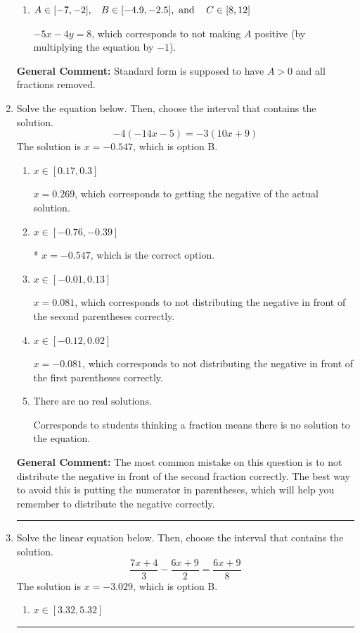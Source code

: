 \documentclass{extbook}[14pt]
\newcommand{\litem}[1]{\item #1

\rule{\textwidth}{0.4pt}}
\begin{document}
\begin{enumerate}
{\begin{enumerate}[label=\Alph*.]
 $1.25x + 1y = -2.0$, which corresponds to not removing rational values for Standard Form.
\item \( A \in [-7, -2], \hspace{3mm} B \in [-4.9, -2.5], \text{ and } \hspace{3mm} C \in [8, 12] \)

 $-5x - 4y = 8$, which corresponds to not making $A$ positive (by multiplying the equation by $-1$).
\end{enumerate}

\textbf{General Comment:} Standard form is supposed to have $A > 0$ and all fractions removed.
}
\litem{
Solve the equation below. Then, choose the interval that contains the solution.
\[ -4(-14x -5) = -3(10x + 9) \]The solution is \( x = -0.547 \), which is option B.\begin{enumerate}[label=\Alph*.]
\item \( x \in [0.17, 0.3] \)

$x = 0.269$, which corresponds to getting the negative of the actual solution.
\item \( x \in [-0.76, -0.39] \)

* $x = -0.547$, which is the correct option.
\item \( x \in [-0.01, 0.13] \)

$x = 0.081$, which corresponds to not distributing the negative in front of the second parentheses correctly.
\item \( x \in [-0.12, 0.02] \)

$x = -0.081$, which corresponds to not distributing the negative in front of the first parentheses correctly.
\item \( \text{There are no real solutions.} \)

Corresponds to students thinking a fraction means there is no solution to the equation.
\end{enumerate}

\textbf{General Comment:} The most common mistake on this question is to not distribute the negative in front of the second fraction correctly. The best way to avoid this is putting the numerator in parentheses, which will help you remember to distribute the negative correctly.
}
\litem{
Solve the linear equation below. Then, choose the interval that contains the solution.
\[ \frac{7x + 4}{3} - \frac{6x + 9}{2} = \frac{6x + 9}{8} \]The solution is \( x = -3.029 \), which is option B.\begin{enumerate}[label=\Alph*.]
\item \( x \in [3.32, 5.32] \)


\end{enumerate}}
\end{enumerate}
\end{document}
